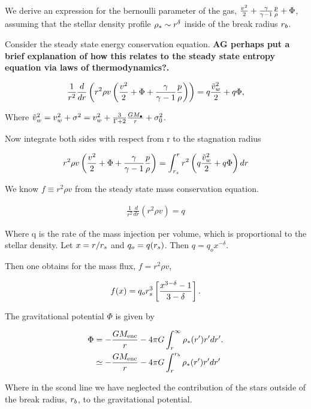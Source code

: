 We derive an expression for the bernoulli parameter of the gas, $\frac{v^2}{2}
+\frac{\gamma}{\gamma-1} \frac{p}{\rho}+\Phi$, assuming that the stellar density
profile $\rho_*\sim r^{\delta}$ inside of the break radius $r_b$. 

Consider the steady state energy conservation equation. {\bf AG perhaps
  put a brief explanation of how this relates to the steady state
  entropy equation via laws of thermodynamics?.}

\begin{align}
\frac{1}{r^2} \frac{d}{dr} \left(r^2 \rho v \left(\frac{v^2}{2} + \Phi
    + \frac{\gamma}{\gamma-1} \frac{p}{\rho}\right) \right) = q \frac{\tilde{v}_{w}^2}{2} + q \Phi,
\label{eq:enCons}
\end{align}

Where $\tilde{v}_{w}^2=v_w^2+\sigma^2= v_w^2+\frac{3}{\Gamma+2}\frac{G
  M_{\bullet}}{r}+\sigma_0^2$.

Now integrate both sides with respect from r to the stagnation radius 

\begin{align}
  r^2 \rho v \left(\frac{v^2}{2}+\Phi+\frac{\gamma}{\gamma-1} \frac{p}{\rho} \right)= \int_{r_s}^{r}
    r^2 \left(q \frac{\tilde{v}_{w}^2}{2} + q\Phi\right) dr
    \label{eq:enConsInt}
\end{align}

We know $f\equiv r^2 \rho v$ from the steady state mass conservation
equation. 

\begin{align}
 \frac{1}{r^2} \frac{d}{dr} \left(r^2 \rho v\right) = q 
\end{align}

Where q is the rate of the mass injection per volume, which is
proportional to the stellar density. Let $x=r/r_s$ and $q_o= q
(r_s)$. Then $q=q_o x^{-\delta}$. 

Then one obtains for the mass flux, $f=r^2 \rho v$,

\begin{align}
 f(x)=q_o r_s^3 \left[\frac{x^{3-\delta}-1}{3-\delta}\right].
 \label{eq:massFlux}
\end{align}

The gravitational potential $\Phi$ is given by

\begin{align}
\Phi&= -\frac{G M_{\rm enc}}{r} - 4 \pi G \int_{r}^{\infty} \rho_*(r') r'
dr'.\nonumber\\
&\simeq -\frac{G M_{\rm enc}}{r} -4 \pi G \int_{r}^{r_b} \rho_*(r') r' dr'
\label{eq:Phi}
\end{align}

Where in the scond line we have neglected the contribution of the
stars outside of the break radius, $r_b$, to the gravitational potential.

